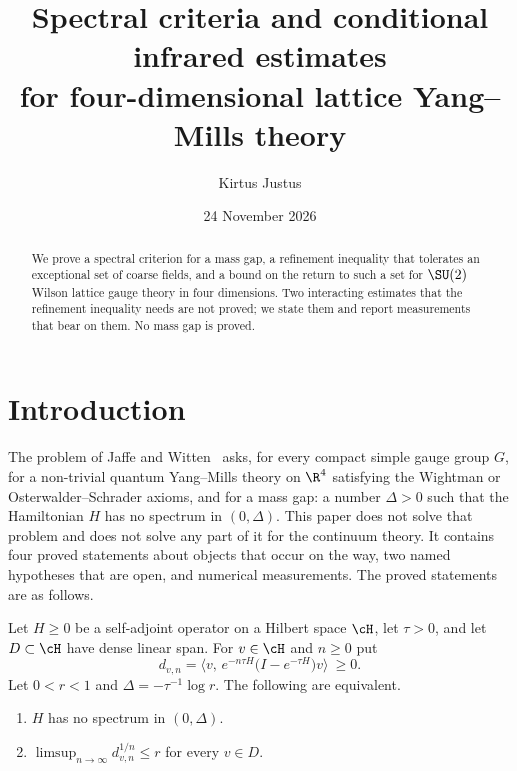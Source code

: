 
\usepackage{tikz}
\usetikzlibrary{positioning,arrows.meta}
\title[Spectral criteria and conditional infrared estimates]{Spectral criteria and conditional infrared estimates\\ for four-dimensional lattice Yang--Mills theory}
\author{Kirtus Justus}
\address{Theoretical Physicist, Port Coquitlam, British Columbia, Canada}
\date{24 November 2026}

\begin{abstract}
We prove a spectral criterion for a mass gap, a refinement inequality that tolerates an exceptional set of
coarse fields, and a bound on the return to such a set for $\SU(2)$ Wilson lattice gauge theory in four
dimensions. Two interacting estimates that the refinement inequality needs are not proved; we state them and
report measurements that bear on them. No mass gap is proved.
\end{abstract}
\maketitle
\tableofcontents

\section{Introduction}\label{s:intro}

The problem of Jaffe and Witten~\cite[\S4]{JW} asks, for every compact simple gauge group $G$, for a
non-trivial quantum Yang--Mills theory on $\R^4$ satisfying the Wightman or Osterwalder--Schrader axioms, and
for a mass gap: a number $\Delta>0$ such that the Hamiltonian $H$ has no spectrum in $(0,\Delta)$. This paper
does not solve that problem and does not solve any part of it for the continuum theory. It contains four
proved statements about objects that occur on the way, two named hypotheses that are open, and numerical
measurements. The proved statements are as follows.

\begin{theorem}\label{t:crit}
Let $H\ge0$ be a self-adjoint operator on a Hilbert space $\cH$, let $\tau>0$, and let $D\subset\cH$ have dense
linear span. For $v\in\cH$ and $n\ge0$ put
\[
d_{v,n}=\big\langle v,\,e^{-n\tau H}\big(I-e^{-\tau H}\big)v\big\rangle\ \ge0 .
\]
Let $0<r<1$ and $\Delta=-\tau^{-1}\log r$. The following are equivalent.
\begin{enumerate}
\item $H$ has no spectrum in $(0,\Delta)$.
\item $\limsup_{n\to\infty}d_{v,n}^{1/n}\le r$ for every $v\in D$.
\end{enumerate}
\end{theorem}

